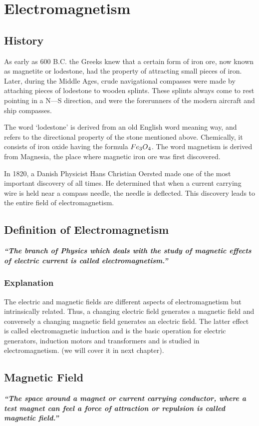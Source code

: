 \chapter{Electromagnetism}
\label{13}
\section{History}
As early as 600 B.C. the Greeks knew that a certain form of iron ore, now known as magnetite or lodestone, had the property of attracting small pieces of iron. Later, during the Middle Ages, crude navigational compasses were made by attaching pieces of lodestone to wooden splints. These splints always come to rest pointing in a N—S direction, and were the forerunners of the modern aircraft and ship compasses.

The word ‘lodestone’ is derived from an old English word meaning way, and refers to the directional property of the stone mentioned above. Chemically, it consists of iron oxide having the formula $Fe\textsubscript{3}O\textsubscript{4}$. The word magnetism is derived from Magnesia, the place where magnetic iron ore was first discovered.

In 1820, a Danish Physicist Hans Christian Oersted made one of the most important discovery of all times. He determined that when a current carrying wire is held near a compass needle, the needle is deflected. This discovery leads to the entire field of electromagnetism.

\section{Definition of Electromagnetism}
\textit{\textbf{“The branch of Physics which deals with the study of magnetic effects of electric current is called electromagnetism.”}}
\subsection*{Explanation}
The electric and magnetic fields are different aspects of electromagnetism but intrinsically related. Thus, a changing electric field generates a magnetic field and conversely a changing magnetic field generates an electric field. The latter effect is called electromagnetic induction and is the basic operation for electric generators, induction motors and transformers and is studied in electromagnetism. (we will cover it in next chapter).
\section{Magnetic Field}
\textit{\textbf{“The space around a magnet or current carrying conductor, where a test magnet can feel a force of attraction  or repulsion is called magnetic field.”}}
